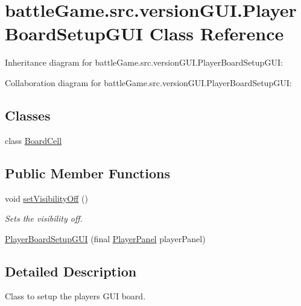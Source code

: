 \hypertarget{classbattleGame_1_1src_1_1versionGUI_1_1PlayerBoardSetupGUI}{}\section{battle\+Game.\+src.\+version\+G\+U\+I.\+Player\+Board\+Setup\+G\+UI Class Reference}
\label{classbattleGame_1_1src_1_1versionGUI_1_1PlayerBoardSetupGUI}


Inheritance diagram for battle\+Game.\+src.\+version\+G\+U\+I.\+Player\+Board\+Setup\+G\+UI\+:


Collaboration diagram for battle\+Game.\+src.\+version\+G\+U\+I.\+Player\+Board\+Setup\+G\+UI\+:
\subsection*{Classes}
\begin{DoxyCompactItemize}
\item 
class \hyperlink{classbattleGame_1_1src_1_1versionGUI_1_1PlayerBoardSetupGUI_1_1BoardCell}{Board\+Cell}
\end{DoxyCompactItemize}
\subsection*{Public Member Functions}
\begin{DoxyCompactItemize}
\item 
void \hyperlink{classbattleGame_1_1src_1_1versionGUI_1_1PlayerBoardSetupGUI_a307762b0bdc3d022ae05d296eb2134b0}{set\+Visibility\+Off} ()\hypertarget{classbattleGame_1_1src_1_1versionGUI_1_1PlayerBoardSetupGUI_a307762b0bdc3d022ae05d296eb2134b0}{}\label{classbattleGame_1_1src_1_1versionGUI_1_1PlayerBoardSetupGUI_a307762b0bdc3d022ae05d296eb2134b0}

\begin{DoxyCompactList}\small\item\em Sets the visibility off. \end{DoxyCompactList}\item 
\hyperlink{classbattleGame_1_1src_1_1versionGUI_1_1PlayerBoardSetupGUI_a179a7f608f934aa197434fafd19ed182}{Player\+Board\+Setup\+G\+UI} (final \hyperlink{classbattleGame_1_1src_1_1versionGUI_1_1PlayerPanel}{Player\+Panel} player\+Panel)
\end{DoxyCompactItemize}


\subsection{Detailed Description}
Class to setup the player\textquotesingle{}s G\+UI board. 

